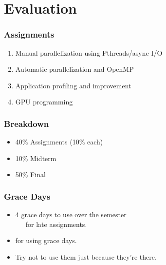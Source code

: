 \section{Evaluation}
\begin{frame}
  \frametitle{Assignments}

  \begin{enumerate}
    \item Manual parallelization using Pthreads/async I/O
    \vfill
    \item Automatic parallelization and OpenMP
    \vfill
    \item Application profiling and improvement
    \vfill
    \item GPU programming
  \end{enumerate}
\end{frame}

\begin{frame}
  \frametitle{Breakdown}

  \begin{itemize}
    \item 40\% Assignments (10\% each)
    \vfill
    \item 10\% Midterm
    \vfill
    \item 50\% Final
  \end{itemize}
\end{frame}

\begin{frame}
  \frametitle{Grace Days}

  \begin{changemargin}{2em}
  \begin{itemize}
    \item 4 grace days to use over the semester \\ ~~~for late assignments.
    \vfill
    \item {} for using grace days.
    \vfill
    \item Try not to use them just because they're there.
  \end{itemize}
  \end{changemargin}
\end{frame}

